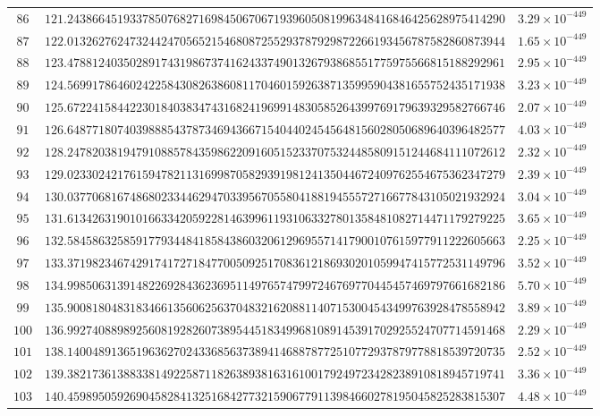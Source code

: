\documentclass[12pt,reqno]{amsart}
\theoremstyle{remark}
\begin{document}
\begin{longtable}{clc}
$86$ & $121.2438664519337850768271698450670671939605081996348416846425628975414290$ & $3.29\times 10^{-449}$ \\
$87$ & $122.0132627624732442470565215468087255293787929872266193456787582860873944$ & $1.65\times 10^{-449}$ \\
$88$ & $123.4788124035028917431986737416243374901326793868551775975566815188292961$ & $2.95\times 10^{-449}$ \\
$89$ & $124.5699178646024225843082638608117046015926387135995904381655752435171938$ & $3.23\times 10^{-449}$ \\
$90$ & $125.6722415844223018403834743168241969914830585264399769179639329582766746$ & $2.07\times 10^{-449}$ \\
$91$ & $126.6487718074039888543787346943667154044024545648156028050689640396482577$ & $4.03\times 10^{-449}$ \\
$92$ & $128.2478203819479108857843598622091605152337075324485809151244684111072612$ & $2.32\times 10^{-449}$ \\
$93$ & $129.0233024217615947821131699870582939198124135044672409762554675362347279$ & $2.39\times 10^{-449}$ \\
$94$ & $130.0377068167486802334462947033956705580418819455572716677843105021932924$ & $3.04\times 10^{-449}$ \\
$95$ & $131.6134263190101663342059228146399611931063327801358481082714471179279225$ & $3.65\times 10^{-449}$ \\
$96$ & $132.5845863258591779344841858438603206129695571417900107615977911222605663$ & $2.25\times 10^{-449}$ \\
$97$ & $133.3719823467429174172718477005092517083612186930201059947415772531149796$ & $3.52\times 10^{-449}$ \\
$98$ & $134.9985063139148226928436236951149765747997246769770445457469797661682186$ & $5.70\times 10^{-449}$ \\
$99$ & $135.9008180483183466135606256370483216208811407153004543499763928478558942$ & $3.89\times 10^{-449}$ \\
$100$ & $136.9927408898925608192826073895445183499681089145391702925524707714591468$ & $2.29\times 10^{-449}$ \\
$101$ & $138.1400489136519636270243368563738941468878772510772937879778818539720735$ & $2.52\times 10^{-449}$ \\
$102$ & $139.3821736138833814922587118263893816316100179249723428238910818945719741$ & $3.36\times 10^{-449}$ \\
$103$ & $140.4598950592690458284132516842773215906779113984660278195045825283815307$ & $4.48\times 10^{-449}$ \\

\end{longtable}
\end{document}
